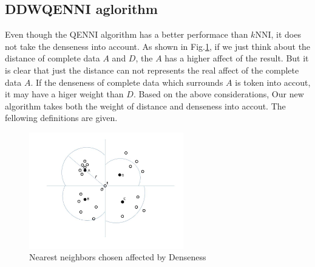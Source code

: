 \documentclass[print]{jicspack}
\begin{document}
\subsection{DDWQENNI aglorithm}
\label{2.4}
Even though the QENNI algorithm has a better performace than $k$NNI, it does not take the denseness into account. As shown in Fig.\ref{fig:figure3}, if we just think about the distance of complete data $A$ and $D$, the $A$ has a higher affect of the result. But it is clear that just the distance can not represents the real affect of the complete data $A$. If the denseness of complete data which surrounds $A$ is token into accout, it may have a higer weight than $D$. Based on the above considerations, Our new algorithm takes both the weight of distance and denseness into accout. The fellowing definitions are given.
\begin{figure}[h]
\centering
\includegraphics[angle=0, width=0.6\textwidth]{figure3.jpg}
\caption{Nearest neighbors chosen affected by Denseness}
\label{fig:figure3}
\end{figure}
\end{document}
